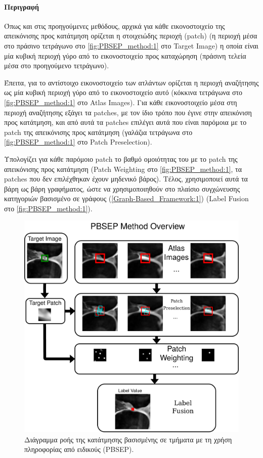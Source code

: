\documentclass[a4paper,12pt]{article}
\newcommand{\paragraphLine}[1]{\paragraph{#1}\mbox{}}
\begin{document}
\paragraphLine{Περιγραφή}

Όπως και στις προηγούμενες μεθόδους, αρχικά για κάθε εικονοστοιχείο της
απεικόνισης προς κατάτμηση ορίζεται η στοιχειώδης περιοχή (patch) (η περιοχή
μέσα στο πράσινο τετράγωνο στο \autoref{fig:PBSEP_method:1} στο Target Image) η
οποία είναι μία κυβική περιοχή γύρο από το εικονοστοιχείο προς καταχώρηση
(πράσινη τελεία μέσα στο προηγούμενο τετράγωνο).

Έπειτα, για το αντίστοιχο εικονοστοιχείο των ατλάντων ορίζεται η περιοχή
αναζήτησης ως μία κυβική περιοχή γύρο από το εικονοστοιχείο αυτό (κόκκινα
τετράγωνα στο \autoref{fig:PBSEP_method:1} στο Atlas Images). Για κάθε
εικονοστοιχείο μέσα στη περιοχή αναζήτησης εξάγει τα patches, με τον ίδιο τρόπο
που έγινε στην απεικόνιση προς κατάτμηση, και από αυτά τα patches επιλέγει αυτά
που είναι παρόμοια με το patch της απεικόνισης προς κατάτμηση (γαλάζια τετράγωνα
στο \autoref{fig:PBSEP_method:1} στο Patch Preselection).

Υπολογίζει για κάθε παρόμοιο patch το βαθμό ομοιότητας του με το patch της
απεικόνισης προς κατάτμηση (Patch Weighting στο \autoref{fig:PBSEP_method:1}, τα
patches που δεν επιλέχθηκαν έχουν μηδενικό βάρος). Τέλος, χρησιμοποιεί αυτά τα
βάρη ως βάρη γραφήματος, ώστε να χρησιμοποιηθούν στο πλαίσιο συγχώνευσης
κατηγοριών βασισμένο σε γράφους (\ref{Graph-Based_Framework:1}) (Label Fusion
στο \autoref{fig:PBSEP_method:1}).

\begin{figure}[H]
    \centering
    \includegraphics[width=\linewidth]{PBSEP_method.png}
    \caption{Διάγραμμα ροής της κατάτμησης βασισμένης σε τμήματα με τη χρήση
             πληροφορίας από ειδικούς (PBSEP).}
    \label{fig:PBSEP_method:1}
\end{figure}
\end{document}
